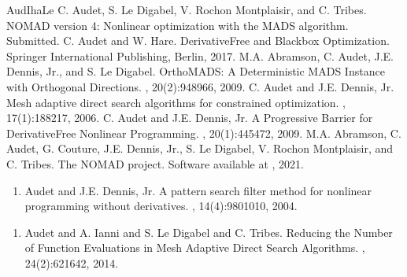 \documentclass[letterpaper,10pt,english]{sphinxmanual}
\begin{document}
\begin{sphinxthebibliography}{AudIhaLe}
\sphinxAtStartPar
C. Audet, S. Le Digabel, V. Rochon Montplaisir, and C. Tribes.
NOMAD version 4: Nonlinear optimization with the MADS algorithm.
Submitted.
\sphinxAtStartPar
C. Audet and W. Hare.
Derivative\sphinxhyphen{}Free and Blackbox Optimization.
Springer International Publishing, Berlin, 2017.
\sphinxAtStartPar
M.A. Abramson, C. Audet, J.E. Dennis, Jr., and S. Le Digabel.
OrthoMADS: A Deterministic MADS Instance with Orthogonal Directions.
, 20(2):948\textendash{}966, 2009.
\sphinxAtStartPar
C. Audet and J.E. Dennis, Jr.
Mesh adaptive direct search algorithms for constrained optimization.
, 17(1):188\textendash{}217, 2006.
\sphinxAtStartPar
C. Audet and J.E. Dennis, Jr.
A Progressive Barrier for Derivative\sphinxhyphen{}Free Nonlinear Programming.
, 20(1):445\textendash{}472, 2009.
\sphinxAtStartPar
M.A. Abramson, C. Audet, G. Couture, J.E. Dennis, Jr., S. Le Digabel, V. Rochon Montplaisir, and C. Tribes. The NOMAD project. Software available at , 2021.
\begin{enumerate}
%
\setcounter{enumi}{2}
\item {} 
\sphinxAtStartPar
Audet and J.E. Dennis, Jr. A pattern search filter method for nonlinear programming without derivatives. , 14(4):980\textendash{}1010, 2004.

\end{enumerate}
\begin{enumerate}
%
\setcounter{enumi}{2}
\item {} 
\sphinxAtStartPar
Audet and A. Ianni and S. Le Digabel and C. Tribes. Reducing the Number of Function Evaluations in Mesh Adaptive Direct Search Algorithms. , 24(2):621\sphinxhyphen{}642, 2014.


\end{enumerate}
\end{sphinxthebibliography}
\end{document}
